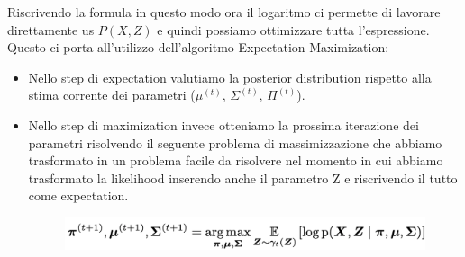 \documentclass[14pt]{extreport}
\begin{document}
Riscrivendo la formula in questo modo ora il logaritmo ci permette di lavorare direttamente us $P(X,Z)$ e quindi possiamo ottimizzare tutta
l'espressione. Questo ci porta all'utilizzo dell'algoritmo Expectation-Maximization:
\begin{itemize}
	\item Nello step di expectation valutiamo la posterior distribution rispetto alla stima corrente dei parametri ($\mu^{(t)}$, $\Sigma^{(t)}$,
	$\Pi^{(t)}$).
	\item Nello step di maximization invece otteniamo la prossima iterazione dei parametri risolvendo il seguente problema di massimizzazione che
	      abbiamo trasformato in un problema facile da risolvere nel momento in cui abbiamo trasformato la likelihood inserendo anche il parametro Z e
	      riscrivendo il tutto come expectation.

	      \begin{figure}[H]
		      \centering
		      \includegraphics[width=0.7\linewidth]{552.jpeg}
	      \end{figure}
\end{itemize}
\end{document}
